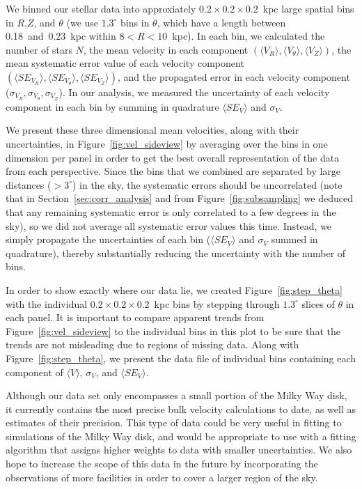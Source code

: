 \documentclass[11pt,preprint]{aastex6}
\begin{document}
We binned our stellar data into approxiately $0.2 \times 0.2 \times 0.2$~kpc large spatial bins in $R$,$Z$, and $\theta$ (we use $1.3^\circ$ bins in $\theta$, which have a length between 0.18~and~0.23~kpc within $8<R<10$~kpc).
In each bin, we calculated the number of stars $N$, the mean velocity in each component $(\langle V_R \rangle, \langle V_\theta \rangle, \langle V_Z \rangle)$, the mean systematic error value of each velocity component $(\langle SE_{V_R} \rangle, \langle SE_{V_\theta} \rangle, \langle SE_{V_Z} \rangle)$, and the propagated error in each velocity component ($\sigma_{V_R}, \sigma_{V_\theta}, \sigma_{V_Z}$).
In our analysis, we measured the uncertainty of each velocity component in each bin by summing in quadrature $\langle SE_V \rangle$ and $\sigma_{V}$.

We present these three dimensional mean velocities, along with their uncertainties, in Figure~\ref{fig:vel_sideview} by averaging over the bins in one dimension per panel in order to get the best overall representation of the data from each perspective.
Since the bins that we combined are separated by large distances ($>3^\circ$) in the sky, the systematic errors should be uncorrelated (note that in Section~\ref{sec:corr_analysis} and from Figure~\ref{fig:subsampling} we deduced that any remaining systematic error is only correlated to a few degrees in the sky), so we did not average all systematic error values this time.
Instead, we simply propagate the uncertainties of each bin ($\langle SE_V \rangle$ and $\sigma_{V}$ summed in quadrature), thereby substantially reducing the uncertainty with the number of bins.

In order to show exactly where our data lie, we created Figure~\ref{fig:step_theta} with the individual $0.2 \times 0.2 \times 0.2$~kpc bins by stepping through $1.3^\circ$ slices of $\theta$ in each panel.
It is important to compare apparent trends from Figure~\ref{fig:vel_sideview} to the individual bins in this plot to be sure that the trends are not misleading due to regions of missing data.
Along with Figure~\ref{fig:step_theta}, we present the data file of individual bins containing each component of $\langle V \rangle$, $\sigma_{V}$, and $\langle SE_{V} \rangle$.

Although our data set only encompasses a small portion of the Milky Way disk, it currently contains the most precise bulk velocity calculations to date, as well as estimates of their precision.
This type of data could be very useful in fitting to simulations of the Milky Way disk, and would be appropriate to use with a fitting algorithm that assigns higher weights to data with smaller uncertainties.
We also hope to increase the scope of this data in the future by incorporating the observations of more facilities in order to cover a larger region of the sky.
\end{document}
